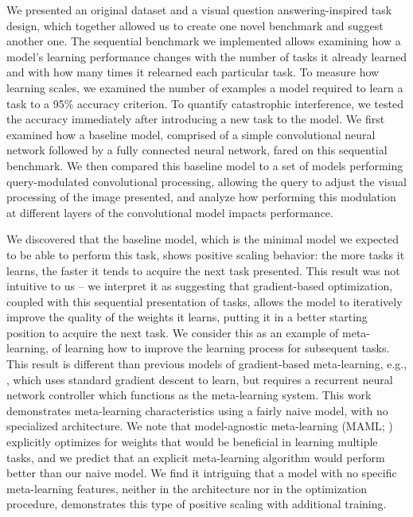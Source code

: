 We presented an original dataset and a visual question answering-inspired task design, which together allowed us to create one novel benchmark and suggest another one. The sequential benchmark we implemented allows examining how a model's learning performance changes with the number of tasks it already learned and with how many times it relearned each particular task. To measure how learning scales, we examined the number of examples a model required to learn a task to a 95\% accuracy criterion. To quantify catastrophic interference, we tested the accuracy immediately after introducing a new task to the model. We first examined how a baseline model, comprised of a simple convolutional neural network followed by a fully connected neural network, fared on this sequential benchmark. We then compared this baseline model to a set of models performing query-modulated convolutional processing, allowing the query to adjust the visual processing of the image presented, and analyze how performing this modulation at different layers of the convolutional model impacts performance.

We discovered that the baseline model, which is the minimal model we expected to be able to perform this task, shows positive scaling behavior: the more tasks it learns, the faster it tends to acquire the next task presented. This result was not intuitive to us -- we interpret it as suggesting that gradient-based optimization, coupled with this sequential presentation of tasks, allows the model to iteratively improve the quality of the weights it learns, putting it in a better starting position to acquire the next task. We consider this as an example of meta-learning, of learning how to improve the learning process for subsequent tasks. This result is different than previous models of gradient-based meta-learning, e.g., \textcite{Hochreiter2001}, which uses standard gradient descent to learn, but requires a recurrent neural network controller which functions as the meta-learning system. This work demonstrates meta-learning characteristics using a fairly naive model, with no specialized architecture. We note that model-agnostic meta-learning (MAML; \cite{Finn2017}) explicitly optimizes for weights that would be beneficial in learning multiple tasks, and we predict that an explicit meta-learning algorithm would perform better than our naive model. We find it intriguing that a model with no specific meta-learning features, neither in the architecture nor in the optimization procedure, demonstrates this type of positive scaling with additional training.


